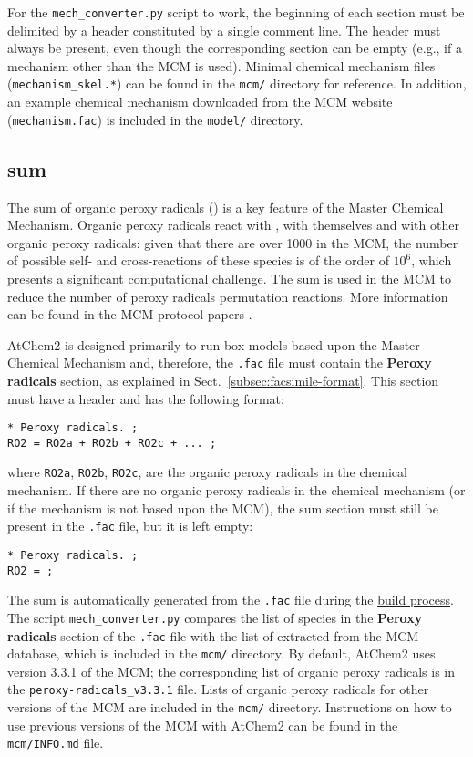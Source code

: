 For the \texttt{mech\_converter.py} script to work, the beginning of
each section must be delimited by a header constituted by a single
comment line. The header must always be present, even though the
corresponding section can be empty (e.g., if a mechanism other than
the MCM is used). Minimal chemical mechanism files
(\texttt{mechanism\_skel.*}) can be found in the \texttt{mcm/}
directory for reference. In addition, an example chemical mechanism
downloaded from the MCM website (\texttt{mechanism.fac}) is included
in the \texttt{model/} directory.

\subsection{ sum} \label{subsec:ro2-sum}

The sum of organic peroxy radicals () is a key feature of the
Master Chemical Mechanism. Organic peroxy radicals react with
, with themselves and with other organic peroxy radicals:
given that there are over 1000  in the MCM, the number of
possible self- and cross-reactions of these species is of the order of
$10^6$, which presents a significant computational challenge. The
 sum is used in the MCM to reduce the number of peroxy
radicals permutation reactions. More information can be found in the
MCM protocol papers \citep{jenkin_1997, saunders_2003}.

AtChem2 is designed primarily to run box models based upon the Master
Chemical Mechanism and, therefore, the \texttt{.fac} file must contain
the \textbf{Peroxy radicals} section, as explained in
Sect.~\ref{subsec:facsimile-format}. This section must have a header
and has the following format:

\begin{verbatim}
* Peroxy radicals. ;
RO2 = RO2a + RO2b + RO2c + ... ;
\end{verbatim}

where \texttt{RO2a}, \texttt{RO2b}, \texttt{RO2c}, are the organic
peroxy radicals in the chemical mechanism. If there are no organic
peroxy radicals in the chemical mechanism (or if the mechanism is not
based upon the MCM), the  sum section must still be present in
the \texttt{.fac} file, but it is left empty:

\begin{verbatim}
* Peroxy radicals. ;
RO2 = ;
\end{verbatim}

The  sum is automatically generated from the \texttt{.fac}
file during the \hyperref[subsec:build-process]{build process}. The
script \texttt{mech\_converter.py} compares the list of species in the
\textbf{Peroxy radicals} section of the \texttt{.fac} file with the
list of  extracted from the MCM database, which is included in
the \texttt{mcm/} directory. By default, AtChem2 uses version 3.3.1 of
the MCM; the corresponding list of organic peroxy radicals is in the
\texttt{peroxy-radicals\_v3.3.1} file. Lists of organic peroxy
radicals for other versions of the MCM are included in the
\texttt{mcm/} directory. Instructions on how to use previous versions
of the MCM with AtChem2 can be found in the \texttt{mcm/INFO.md} file.

